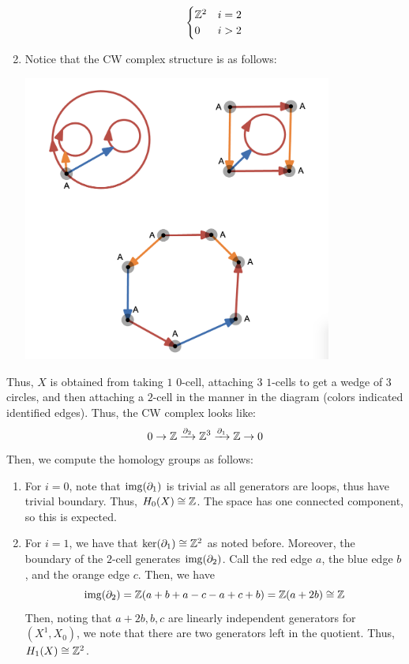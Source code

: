 \documentclass[12pt]{article}
\begin{document}
\begin{solution}
\begin{enumerate}
\[\begin{cases}
            \mathbb Z^2 & i = 2 \\
            0 & i > 2
        \end{cases}\]
        \newpage
        \item Notice that the CW complex structure is as follows: \bbni
        \begin{centering}
            \includegraphics[width=0.8\textwidth]{assets/hwk8_cw.png}
        \end{centering}
    \end{enumerate}
    Thus, $X$ is obtained from taking $1$ $0$-cell, attaching $3$ $1$-cells to get a wedge of $3$ circles, and then attaching a $2$-cell in the manner in the diagram (colors indicated identified edges). Thus, the CW complex looks like: 
    \[ 0 \to \mathbb Z \xrightarrow{\partial_2} \mathbb Z^3 \xrightarrow{\partial_1} \mathbb Z \to 0\]    
    Then, we compute the homology groups as follows:
    \begin{enumerate}
        \item For $i = 0$, note that $\operatorname{img}(\partial_1)$ is trivial as all generators are loops, thus have trivial boundary. Thus, $H_0(X) \cong \mathbb Z$. The space has one connected component, so this is expected.
        \item For $i = 1$, we have that $\ker(\partial_1) \cong \mathbb Z^2$ as noted before. Moreover, the boundary of the $2$-cell generates $\operatorname{img}(\partial_2)$. Call the red edge $a$, the blue edge $b$, and the orange edge $c$. Then, we have
        \[ \operatorname{img}(\partial_2) = \mathbb Z (a +b + a - c - a + c + b) = \mathbb Z(a+2b) \cong \mathbb Z\]
        Then, noting that $a+2b, b, c$ are linearly independent generators for $(X^1, X_0)$, we note that there are two generators left in the quotient. Thus, $H_1(X) \cong \mathbb Z^2$.

\end{enumerate}
\end{solution}
\end{document}
